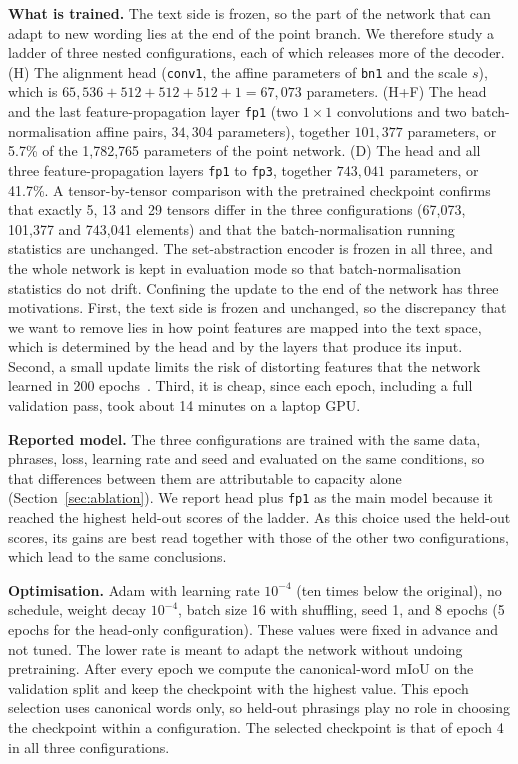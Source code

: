 \documentclass[conference]{IEEEtran}
\begin{document}
\textbf{What is trained.} The text side is frozen, so the part of the network that can adapt to new wording lies at the end of the point branch. We therefore study a ladder of three nested configurations, each of which releases more of the decoder. (H) The alignment head (\texttt{conv1}, the affine parameters of \texttt{bn1} and the scale $s$), which is $65{,}536+512+512+512+1=67{,}073$ parameters. (H+F) The head and the last feature-propagation layer \texttt{fp1} (two $1\times1$ convolutions and two batch-normalisation affine pairs, $34{,}304$ parameters), together $101{,}377$ parameters, or 5.7\% of the 1,782,765 parameters of the point network. (D) The head and all three feature-propagation layers \texttt{fp1} to \texttt{fp3}, together $743{,}041$ parameters, or 41.7\%. A tensor-by-tensor comparison with the pretrained checkpoint confirms that exactly 5, 13 and 29 tensors differ in the three configurations (67,073, 101,377 and 743,041 elements) and that the batch-normalisation running statistics are unchanged. The set-abstraction encoder is frozen in all three, and the whole network is kept in evaluation mode so that batch-normalisation statistics do not drift. Confining the update to the end of the network has three motivations. First, the text side is frozen and unchanged, so the discrepancy that we want to remove lies in how point features are mapped into the text space, which is determined by the head and by the layers that produce its input. Second, a small update limits the risk of distorting features that the network learned in 200 epochs~\cite{kumar2022}. Third, it is cheap, since each epoch, including a full validation pass, took about 14 minutes on a laptop GPU.

\textbf{Reported model.} The three configurations are trained with the same data, phrases, loss, learning rate and seed and evaluated on the same conditions, so that differences between them are attributable to capacity alone (Section~\ref{sec:ablation}). We report head plus \texttt{fp1} as the main model because it reached the highest held-out scores of the ladder. As this choice used the held-out scores, its gains are best read together with those of the other two configurations, which lead to the same conclusions.

\textbf{Optimisation.} Adam with learning rate $10^{-4}$ (ten times below the original), no schedule, weight decay $10^{-4}$, batch size 16 with shuffling, seed 1, and 8 epochs (5 epochs for the head-only configuration). These values were fixed in advance and not tuned. The lower rate is meant to adapt the network without undoing pretraining. After every epoch we compute the canonical-word mIoU on the validation split and keep the checkpoint with the highest value. This epoch selection uses canonical words only, so held-out phrasings play no role in choosing the checkpoint within a configuration. The selected checkpoint is that of epoch 4 in all three configurations.
\end{document}
